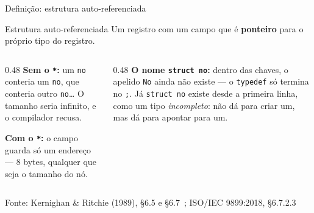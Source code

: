 \documentclass[aspectratio=169]{beamer}
\newcommand{\fonte}[1]{\vfill\hfill{\scriptsize\textcolor{UFSGray}{Fonte: #1}}}
\begin{document}
\begin{frame}{Definição: estrutura auto-referenciada}
  \begin{block}{Estrutura auto-referenciada}
    \small Um registro com um campo que é \textbf{ponteiro} para o próprio
    tipo do registro.
  \end{block}
  \begin{columns}[T]
    \begin{column}{0.48\textwidth}
      \small
      \textbf{Sem o \texttt{*}:} um \texttt{no} conteria um \texttt{no}, que
      conteria outro \texttt{no}\ldots{} O tamanho seria infinito, e o
      compilador recusa.

      \medskip
      \textbf{Com o \texttt{*}:} o campo guarda só um endereço --- 8 bytes,
      qualquer que seja o tamanho do nó.
    \end{column}
    \begin{column}{0.48\textwidth}
      \small
      \textbf{O nome \texttt{struct no}:} dentro das chaves, o apelido
      \texttt{No} ainda não existe --- o \texttt{typedef} só termina no
      \texttt{;}. Já \texttt{struct no} existe desde a primeira linha, como
      um tipo \emph{incompleto}: não dá para criar um, mas dá para apontar
      para um.
    \end{column}
  \end{columns}
  \fonte{Kernighan \& Ritchie (1989), §6.5 e §6.7~\cite{kernighan1989c};
    ISO/IEC 9899:2018, §6.7.2.3~\cite{iso2018c17}}
\end{frame}
\end{document}
